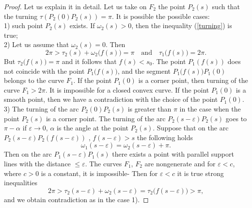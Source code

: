 \documentclass[11pt,oneside]{amsart}
\theoremstyle{theorem}
\theoremstyle{definition}
\theoremstyle{remark}
\begin{document}
\begin{proof}
Let us explain it in detail. Let us take on $F_2$ the point $P_2(s)$ such that the turning 
$\tau(P_2(0)P_2(s))=\pi$. It is possible the possible cases: \\
1) such point $P_2(s)$ exists. If $\omega_2(s) >0$, then the inequality (\ref{turning}) is true; \\
2) Let us assume that $\omega_2(s)=0$. Then 
$$ 2\pi > \tau_2(s)+\omega_2\big(f(s)\big)=\pi \quad \text{and} \quad \tau_1\big(f(s)\big)=2\pi.$$
But $\tau_2\big(f(s)\big)= \pi$ and it follows that $f(s) < s_0$. The point $P_1(f(s))$ does not coincide
with  the point $P_1\big(f(s)\big)$, and the segment $P_1\big(f(s)\big)P_1(0)$ belongs to the curve $F_1$. 
If the point $P_1(0)$ is a corner point, then turning of the curve $F_1 >2\pi$. 
It is impossible for a closed convex curve. 
If the point $P_1(0)$ is a smooth point, then we have a contradiction with the choice of the point $P_1(0)$. \\
3) The turning of the arc $P_2(0)P_2(s)$ is greater than $\pi$ in the case when the point $P_2(s)$ is a corner point. The turning of the arc $P_2(s-\varepsilon)P_2(s)$ goes to $\pi - \alpha$ if $\varepsilon \to 0$, $\alpha$ is the angle at the point $P_2(s)$. 
Suppose that on the arc $P_2(s-\varepsilon)P_2(f(s-\varepsilon))$ , $f(s-\varepsilon) >s$ the following holds
$$\omega_1(s-\varepsilon) = \omega_2(s-\varepsilon) + \pi.$$
Then on the arc $P_1(s-\varepsilon)P_1(s)$ there exists a point with parallel support lines with the 
distance $\leq \varepsilon$. The curves $F_1$, $F_2$ are nongenerate and for $\varepsilon < c$, 
where $c >0$ is a constant, it is impossible- 
Then for $\varepsilon < c$ it is true strong inequalities
$$ 2\pi > \tau_2(s-\varepsilon) +  \omega_2(s-\varepsilon) =   \tau_2\big(f(s-\varepsilon)\big) > \pi,  $$
and we obtain contradiction as in the case 1).




\end{proof}
\end{document}

